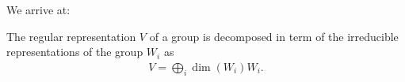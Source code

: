 We arrive at:
\begin{theorem}
	The regular representation $V$ of a group is decomposed in term of the irreducible representations of the group $W_i$ as
	\begin{align*}
		V = \bigoplus_i \dim (W_i) W_i.
	\end{align*}
\end{theorem}

%
%
%
%
%
%	
%
